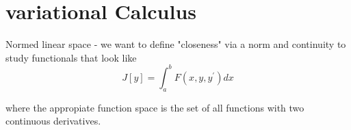 \section{variational Calculus}

Normed linear space - we want to define "closeness" via a norm and continuity to study functionals that look like
$$
J[y] = \int_{a}^{b} F(x, y, y^\prime) dx
$$

where the appropiate function space is the set of all functions with two continuous derivatives.